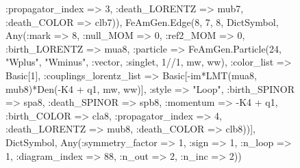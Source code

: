 \documentclass{revtex4}
\begin{document}
\begin{figure}[!htb]
\begin{center}
{:propagator_index => 3, :death_LORENTZ => mub7, :death_COLOR => clb7)), FeAmGen.Edge(8, 7, 8, Dict{Symbol, Any}(:mark => 8, :null_MOM => 0, :ref2_MOM => 0, :birth_LORENTZ => mua8, :particle => FeAmGen.Particle(24, "Wplus", "Wminus", :vector, :singlet, 1//1, mw, ww), :color_list => Basic[1], :couplings_lorentz_list => Basic[-im*LMT(mua8, mub8)*Den(-K4 + q1, mw, ww)], :style => "Loop", :birth_SPINOR => spa8, :death_SPINOR => spb8, :momentum => -K4 + q1, :birth_COLOR => cla8, :propagator_index => 4, :death_LORENTZ => mub8, :death_COLOR => clb8))], Dict{Symbol, Any}(:symmetry_factor => 1, :sign => 1, :n_loop => 1, :diagram_index => 88, :n_out => 2, :n_inc => 2)) 
}
\end{center}
\end{figure}
\end{document}
